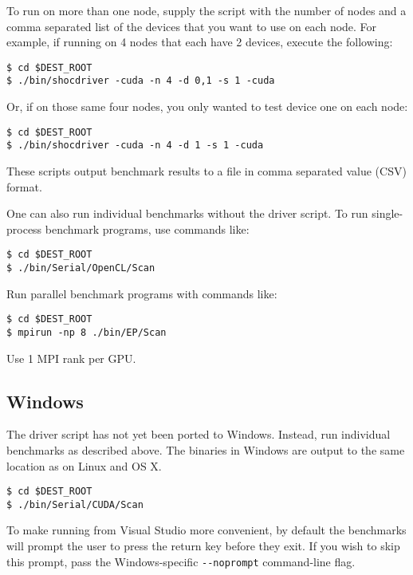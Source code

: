 \documentclass[11pt]{article}
\begin{document}
To run on more than one node, supply the script with the number of nodes and 
a comma separated list of the devices that you want to use on each node. For
example, if running on 4 nodes that each have 2 devices, execute the following: 

\begin{Verbatim}[frame=single]
$ cd $DEST_ROOT
$ ./bin/shocdriver -cuda -n 4 -d 0,1 -s 1 -cuda
\end{Verbatim}

Or, if on those same four nodes, you only wanted to test device one on each node:

\begin{Verbatim}[frame=single]
$ cd $DEST_ROOT
$ ./bin/shocdriver -cuda -n 4 -d 1 -s 1 -cuda
\end{Verbatim}

These scripts output benchmark results to a file in comma separated value (CSV) format.

One can also run individual benchmarks without the driver script.
To run single-process benchmark programs, use commands like:

\begin{Verbatim}[frame=single]
$ cd $DEST_ROOT
$ ./bin/Serial/OpenCL/Scan 
\end{Verbatim}

Run parallel benchmark programs with commands like:

\begin{Verbatim}[frame=single]
$ cd $DEST_ROOT
$ mpirun -np 8 ./bin/EP/Scan
\end{Verbatim}

Use 1 MPI rank per GPU.  

\subsection{Windows}

The driver script has not yet been ported to Windows.
Instead, run individual benchmarks as described above.
The binaries in Windows are output to the same location
as on Linux and OS X.

\begin{Verbatim}[frame=single]
$ cd $DEST_ROOT
$ ./bin/Serial/CUDA/Scan 
\end{Verbatim}

To make running from Visual Studio more convenient,
by default the benchmarks will prompt the user
to press the return key before they exit.
If you wish to skip this prompt, pass the
Windows-specific \verb+--noprompt+ command-line flag.
\end{document}
